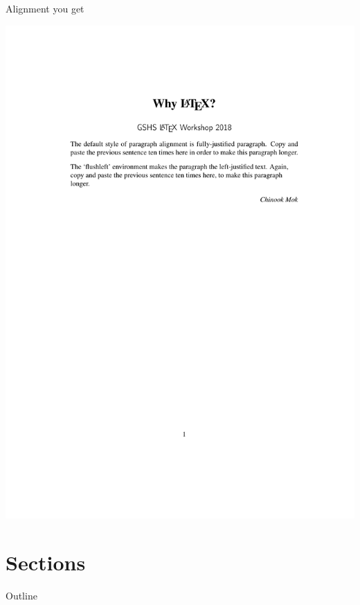 \documentclass[12pt]{gshs_lecture}
\begin{document}
\begin{frame}[t]{Alignment}\small
you get
\begin{center}
\begin{framed}
\includegraphics[width=\textwidth,trim={0cm 16cm 0cm 3cm},clip]{./test_article/article001.pdf}
\end{framed}
\end{center}
\end{frame}


\section{Sections} %

\begin{frame}[t]{Outline}
\tableofcontents[currentsection]
\end{frame}
\end{document}
